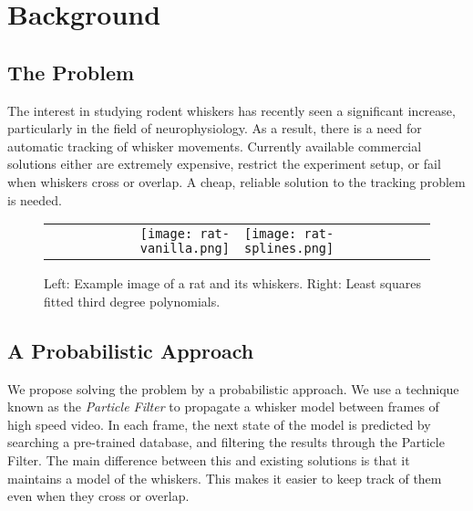 \section*{Background}
\subsection*{The Problem}
The interest in studying rodent whiskers has recently seen a significant increase, particularly in the field of neurophysiology. As a result, there is a need for automatic tracking of whisker movements. Currently available commercial solutions either are extremely expensive, restrict the experiment setup, or fail when whiskers cross or overlap. A cheap, reliable solution to the tracking problem is needed.

\begin{figure}
  \centering
  \begin{tabular}{rl}
    \texttt{[image: rat-vanilla.png]}
    & \texttt{[image: rat-splines.png]}
    \label{fig:rat}
  \end{tabular}

  \caption{Left: Example image of a rat and its whiskers. Right: Least squares fitted third degree polynomials.}
  \label{fig:whiskers}
\end{figure}

\subsection*{A Probabilistic Approach}
We propose solving the problem by a probabilistic approach. We use a technique known as the \emph{Particle Filter} to propagate a whisker model between frames of high speed video. In each frame, the next state of the model is predicted by searching a pre-trained database, and filtering the results through the Particle Filter. The main difference between this and existing solutions is that it maintains a model of the whiskers. This makes it easier to keep track of them even when they cross or overlap.
